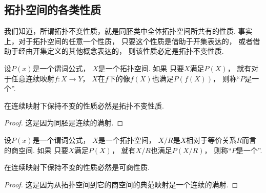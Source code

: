 \subsection{拓扑空间的各类性质}
我们知道，所谓拓扑不变性质，就是同胚类中全体拓扑空间所共有的性质.
事实上，对于拓扑空间的任意一个性质，
只要这个性质是借助于开集表达的，
或者借助于经由开集定义的其他概念表达的，
则该性质必定是拓扑不变性质.

\begin{definition}
设\(P(x)\)是一个谓词公式，
\(X\)是一个拓扑空间.
如果
	只要\(X\)满足\(P(X)\)，
	就有对于任意连续映射\(f\colon X \to Y\)，
	\(X\)在\(f\)下的像\(f(X)\)也满足\(P(f(X))\)，
则称“\(P\)是一个”.
\end{definition}

\begin{proposition}
在连续映射下保持不变的性质必然是拓扑不变性质.
\begin{proof}
这是因为同胚是连续的满射.
\end{proof}
\end{proposition}

\begin{definition}
设\(P(x)\)是一个谓词公式，
\(X\)是一个拓扑空间，
\(X/R\)是\(X\)相对于等价关系\(R\)而言的商空间.
如果
	只要\(X\)满足\(P(X)\)，
	就有\(X/R\)也满足\(P(X/R)\)，
则称“\(P\)是一个”.
\end{definition}

\begin{proposition}
在连续映射下保持不变的性质必然是可商性质.
\begin{proof}
这是因为从拓扑空间到它的商空间的典范映射是一个连续的满射.
\end{proof}
\end{proposition}

